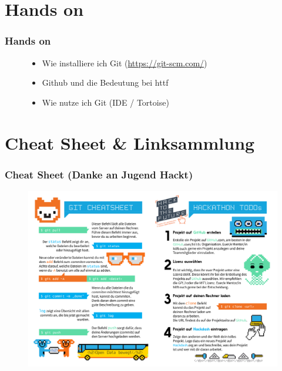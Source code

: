 \documentclass{beamer}
\begin{document}
\section{Hands on}

\begin{frame}
\frametitle{Hands on}
\begin{figure}

\begin{itemize}
	\item Wie installiere ich Git (\url{https://git-scm.com/})
	\item Github und die Bedeutung bei httf
	\item Wie nutze ich Git (IDE / Tortoise)
\end{itemize}

\end{figure}
\end{frame}

\section{Cheat Sheet \& Linksammlung}

\begin{frame}
\frametitle{Cheat Sheet (Danke an Jugend Hackt)}
\begin{figure}
\includegraphics[scale=0.3]{images/Cheatsheet_git.png}
\end{figure}
\end{frame}
\end{document}
